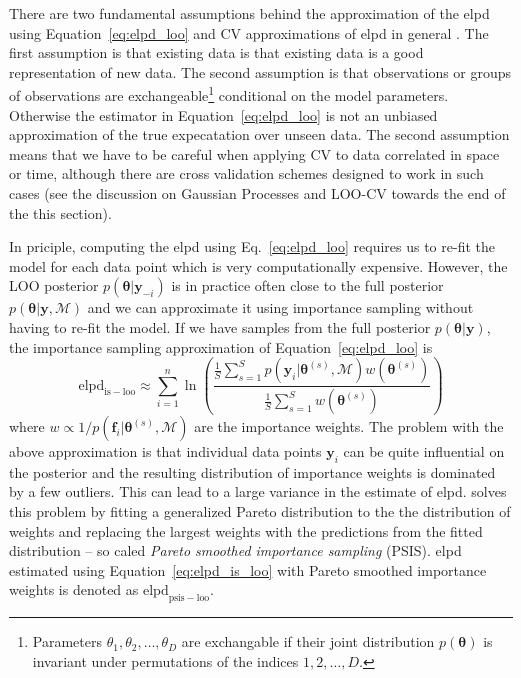 \documentclass[12pt,dvipsnames]{report}
\renewcommand{\vec}[1]{\boldsymbol{\mathbf{#1}}}
\begin{document}
There are two fundamental assumptions behind the approximation of the elpd using 
Equation~\ref{eq:elpd_loo} and CV approximations of elpd in general 
\citep[see][for a more thorough discussion]{arXiv:1810.05374}.
The first assumption is that existing data is that existing data is a good representation
of new data. The second assumption is that observations or groups of observations are 
exchangeable\footnote{Parameters $\theta_1,\theta_2,\ldots,\theta_D$ are
exchangable if their joint distribution $p(\vec \theta)$ is invariant under permutations
of the indices $1,2,\ldots,D$.} conditional on the model parameters. Otherwise the 
estimator in Equation~\ref{eq:elpd_loo} is not an unbiased approximation of the true 
expecatation over unseen data. The second assumption means that we have to be careful when 
applying CV to data correlated in space or time, although there are cross validation
schemes designed to work in such cases (see the discussion on Gaussian Processes and 
LOO-CV towards the end of the this section).

In priciple, computing the elpd using Eq.~\ref{eq:elpd_loo} requires us to re-fit the model 
for each data point which 
is very computationally expensive. However, the LOO posterior $p(\vec \theta|\vec y_{-i})$
is in practice often close to the full posterior $p(\vec \theta|\vec y,\mathcal{M})$
and we can approximate it using importance sampling without having to re-fit the model.
If we have samples from the full posterior $p(\vec \theta|\vec y)$, the importance 
sampling approximation of Equation~\ref{eq:elpd_loo} is 
\begin{equation}
\mathrm{elpd}_\mathrm{is-loo}\approx\sum_{i=1}^n\ln\left(\frac{\frac{1}{S} \sum_{s=1}^{S} p\left( \vec y_{i} \lvert\vec \theta^{(s)},\mathcal{M}\right) w\left(\vec\theta^{(s)}\right)}{\frac{1}{S} \sum_{s=1}^{S} w\left(\vec\theta^{(s)}\right)}\right)
\label{eq:elpd_is_loo}
\end{equation}
where $w \propto 1/p\left(\vec f_{i} \lvert\vec\theta^{(s)},\mathcal{M}\right)$ are the 
importance weights.
The problem with the above approximation is that individual data points $\vec y_i$
can be quite influential on the posterior and the resulting distribution of importance 
weights is dominated by a few outliers. This can lead to a large variance in the estimate 
of elpd. \citet{2015arXiv150702646V} solves this problem by fitting a generalized
Pareto distribution to the the distribution of weights and replacing the largest 
weights with the predictions from the fitted distribution -- so caled 
\emph{Pareto smoothed importance sampling} (PSIS). 
elpd estimated using Equation~\ref{eq:elpd_is_loo} with Pareto smoothed
importance weights is denoted as $\mathrm{elpd}_\mathrm{psis-loo}$.
\end{document}
